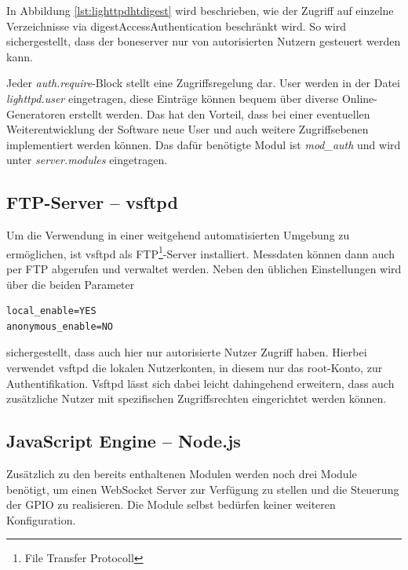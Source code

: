 In Abbildung \ref{lst:lighttpdhtdigest} wird beschrieben, wie der Zugriff auf einzelne Verzeichnisse via \gls{digestAccessAuthentication} beschränkt wird. So wird sichergestellt, dass der boneserver nur von autorisierten Nutzern gesteuert werden kann.

Jeder \textit{auth.require}-Block stellt eine Zugriffsregelung dar. User werden in der Datei \textit{lighttpd.user} eingetragen, diese Einträge können bequem über diverse Online-Generatoren erstellt werden. Das hat den Vorteil, dass bei einer eventuellen Weiterentwicklung der Software neue User und auch weitere Zugriffsebenen implementiert werden können. Das dafür benötigte Modul ist \textit{mod\_auth} und wird unter \textit{server.modules} eingetragen.


\subsection{FTP-Server -- vsftpd}
\label{subsec:vsftpd}
Um die Verwendung in einer weitgehend automatisierten Umgebung zu ermöglichen, ist vsftpd als FTP\footnote{File Transfer Protocoll}-Server installiert. Messdaten können dann auch per FTP abgerufen und verwaltet werden. Neben den üblichen Einstellungen wird über die beiden Parameter

\begin{lstlisting}
local_enable=YES
anonymous_enable=NO
\end{lstlisting}
sichergestellt, dass auch hier nur autorisierte Nutzer Zugriff haben. Hierbei verwendet vsftpd die lokalen Nutzerkonten, in diesem nur das root-Konto, zur Authentifikation. Vsftpd lässt sich dabei leicht dahingehend erweitern, dass auch zusätzliche Nutzer mit spezifischen Zugriffsrechten eingerichtet werden können.


\subsection{JavaScript Engine -- Node.js}

Zusätzlich zu den bereits enthaltenen Modulen werden noch drei Module benötigt, um einen WebSocket Server zur Verfügung zu stellen und die Steuerung der GPIO zu realisieren. Die Module selbst bedürfen keiner weiteren Konfiguration.

